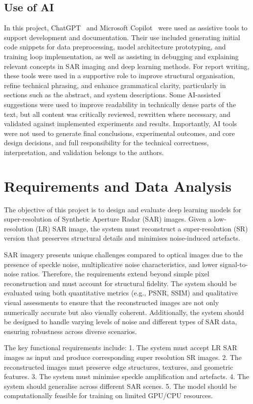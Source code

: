 \documentclass[conference]{IEEEtran}
\begin{document}
\subsection{Use of AI}
In this project, ChatGPT~\cite{chatgpt_2026} and Microsoft Copilot~\cite{microsoft_copilot} were used as assistive tools to support development and documentation. Their use included generating initial code snippets for data preprocessing, model architecture prototyping, and training loop implementation, as well as assisting in debugging and explaining relevant concepts in SAR imaging and deep learning methods. For report writing, these tools were used in a supportive role to improve structural organisation, refine technical phrasing, and enhance grammatical clarity, particularly in sections such as the abstract, and system descriptions. Some AI-assisted suggestions were used to improve readability in technically dense parts of the text, but all content was critically reviewed, rewritten where necessary, and validated against implemented experiments and results. Importantly, AI tools were not used to generate final conclusions, experimental outcomes, and core design decisions, and full responsibility for the technical correctness, interpretation, and validation belongs to the authors.

\section{Requirements and Data Analysis}
The objective of this project is to design and evaluate deep learning models for super-resolution of Synthetic Aperture Radar (SAR) images. Given a low-resolution (LR) SAR image, the system must reconstruct a super-resolution (SR) version that preserves structural details and minimises noise-induced artefacts.

SAR imagery presents unique challenges compared to optical images due to the presence of speckle noise, multiplicative noise characteristics, and lower signal-to-noise ratios. Therefore, the requirements extend beyond simple pixel reconstruction and must account for structural fidelity. The system should be evaluated using both quantitative metrics (e.g., PSNR, SSIM) and qualitative visual assessments to ensure that the reconstructed images are not only numerically accurate but also visually coherent. Additionally, the system should be designed to handle varying levels of noise and different types of SAR data, ensuring robustness across diverse scenarios.

The key functional requirements include:
1. The system must accept LR SAR images as input and produce corresponding super resolution SR images.
2. The reconstructed images must preserve edge structures, textures, and geometric features.
3. The system must minimise speckle amplification and artefacts.
4. The system should generalise across different SAR scenes.
5. The model should be computationally feasible for training on limited GPU/CPU resources.
\end{document}
